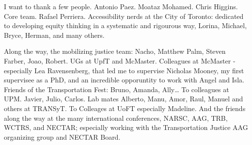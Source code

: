 \documentclass[
11pt, %
oneside, %
english, %
singlespacing, %
]{macthesis} %
\def\blankpage{%
      \clearpage%
      \thispagestyle{empty}%
      \addtocounter{page}{-1}%
      \null%
      \clearpage}
\begin{document}
  \begin{acknowledgements}
  \addchaptertocentry{\acknowledgementname} %
    I want to thank a few people. Antonio Paez. Moataz Mohamed. Chris Higgins. Core team. Rafael Perriera. Accessibility nerds at the City of Toronto: dedicated to developing equity thinking in a systematic and rigourous way, Lorina, Michael, Bryce, Herman, and many others.

    Along the way, the mobilizing justice team: Nacho, Matthew Palm, Steven Farber, Joao, Robert. UGs at UpfT and McMaster. Colleagues at McMaster - especially Lea Ravensenberg, that led me to supervise Nicholas Mooney, my first supervisee as a PhD, and an incredible opporuntity to work with Angel and Isla. Friends of the Transportation Fest: Bruno, Amanda, Ally\ldots{} To colleagues at UPM. Javier, Julio, Carlos. Lab mates Alberto, Manu, Amor, Raul, Manuel and others at TRANSyT. To Colleages at UoFT especially Madeline. And the friends along the way at the many international conferences, NARSC, AAG, TRB, WCTRS, and NECTAR; especially working with the Transportation Justice AAG organizing group and NECTAR Board.
  \end{acknowledgements}
\blankpage
\clearpage


\tableofcontents %

\listoffigures %

\listoftables %


\end{document}

